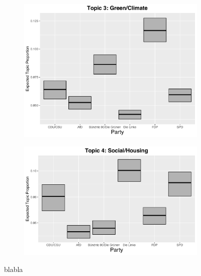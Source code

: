 \begin{figure}[h!]
  \centering
  \begin{subfigure}[b]{0.4\linewidth}
    \includegraphics[width=\linewidth]{../plots/appendix/4_4/beta_t3_cat.pdf}
  \end{subfigure}
  \begin{subfigure}[b]{0.4\linewidth}
    \includegraphics[width=\linewidth]{../plots/appendix/4_4/beta_t4_cat.pdf}
  \end{subfigure}
  \caption{blabla}
  \label{fig:coffee}
\end{figure}

